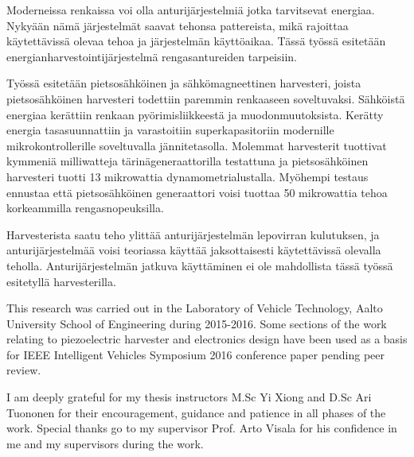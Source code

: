 \documentclass[english,12pt,a4paper,pdftex,elec,utf8]{aaltothesis}
\begin{document}
\newpage
%
\begin{abstractpage}[finnish]
Moderneissa renkaissa voi olla anturijärjestelmiä jotka tarvitsevat energiaa. Nykyään nämä järjestelmät saavat tehonsa pattereista, mikä 
rajoittaa käytettävissä olevaa tehoa ja järjestelmän käyttöaikaa.
Tässä työssä esitetään energianharvestointijärjestelmä rengasantureiden tarpeisiin.  

Työssä esitetään pietsosähköinen ja sähkömagneettinen harvesteri, joista pietsosähköinen harvesteri todettiin paremmin renkaaseen soveltuvaksi. Sähköistä energiaa kerättiin renkaan pyörimisliikkeestä ja muodonmuutoksista. Kerätty energia tasasuunnattiin ja varastoitiin superkapasitoriin modernille mikrokontrollerille soveltuvalla jännitetasolla. Molemmat harvesterit tuottivat kymmeniä milliwatteja tärinägeneraattorilla testattuna ja pietsosähköinen harvesteri tuotti 13 mikrowattia dynamometrialustalla. Myöhempi testaus ennustaa että pietsosähköinen generaattori voisi tuottaa 50 mikrowattia tehoa korkeammilla rengasnopeuksilla. 

Harvesterista saatu teho ylittää anturijärjestelmän lepovirran kulutuksen, ja anturijärjestelmää voisi teoriassa käyttää jaksottaisesti käytettävissä olevalla teholla. Anturijärjestelmän jatkuva käyttäminen ei ole mahdollista tässä työssä esitetyllä harvesterilla. 
\end{abstractpage}


This research was carried out in the Laboratory of Vehicle Technology, Aalto University School of Engineering during 2015-2016. 
Some sections of the work relating to piezoelectric harvester and electronics design have been used as a basis for IEEE Intelligent Vehicles Symposium 2016 
conference paper pending peer review.   

I am deeply grateful for my thesis instructors M.Sc Yi Xiong and D.Sc Ari Tuononen for their encouragement, guidance and patience in all phases of the work. 
Special thanks go to my supervisor Prof. Arto Visala for his confidence in me and my supervisors during the work. 
\end{document}
